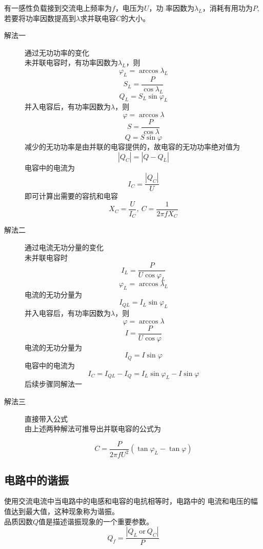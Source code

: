 \begin{example}
    有一感性负载接到交流电上频率为$f$，电压为$U$，功
    率因数为$\lambda_L$，消耗有用功为$P$,若要将功率因数提高到$\lambda$求并联电容$C$的大小。
    \begin{description}
        \item[解法一] 通过无功功率的变化\\
        未并联电容时，有功率因数为$\lambda_L$，则
        \[
            \varphi_L =\arccos \lambda_L
        \]
        \[
        S_L = \frac{P}{\cos \lambda_L}    
        \]
        \[
            Q_L = S_L\sin \varphi_L
        \]
        并入电容后，有功率因数为$\lambda$，则
        \[
            \varphi = \arccos \lambda
        \]
        \[
            S = \frac{P}{\cos \lambda}
        \]
        \[
            Q = S\sin \varphi
        \]
        减少的无功功率是由并联的电容提供的，故电容的无功功率绝对值为
        \[
            \left\lvert Q_C\right\rvert = \left\lvert Q - Q_L \right\rvert
        \]
        电容中的电流为
        \[
            I_C = \frac{\left\lvert Q_C\right\rvert}{U}
        \]
        即可计算出需要的容抗和电容
        \[
            X_C = \frac{U}{I_C},~ C = \frac{1}{2\pi f X_C}  
        \]            
        \item[解法二] 通过电流无功分量的变化\\
        未并联电容时
        \[
            I_L = \frac{P}{U\cos \varphi _L}
        \]
        \[
            \varphi_L = \arccos \lambda_L
        \]
        电流的无功分量为
        \[
            I_{QL} = I_L \sin \varphi_L
        \]
        并入电容后，有功率因数为$\lambda$，则
        \[
            \varphi = \arccos \lambda
        \]
        \[
            I = \frac{P}{U\cos \varphi}
        \]
        电流的无功分量为
        \[
            I_Q = I \sin \varphi
        \]
        电容中的电流为
        \[
            I_C = I_{QL}-I_Q =I_{L}\sin \varphi_L - I \sin \varphi
        \]
        后续步骤同解法一
        \item[解法三]直接带入公式\\
        由上述两种解法可推导出并联电容的公式为

        \[
            C = \frac{P}{2\pi f U^2}(\tan \varphi_L - \tan \varphi)  
        \]
        
    \end{description}
\end{example}

\subsection{电路中的谐振}
使用交流电流中当电路中的电感和电容的电抗相等时，电路中的
电流和电压的幅值达到最大值，这种现象称为谐振。\\
品质因数$Q$值是描述谐振现象的一个重要参数。
\[
    Q_f = \frac{\left\lvert Q_L ~ \text{or} ~ Q_C\right\rvert }{P}
\]

